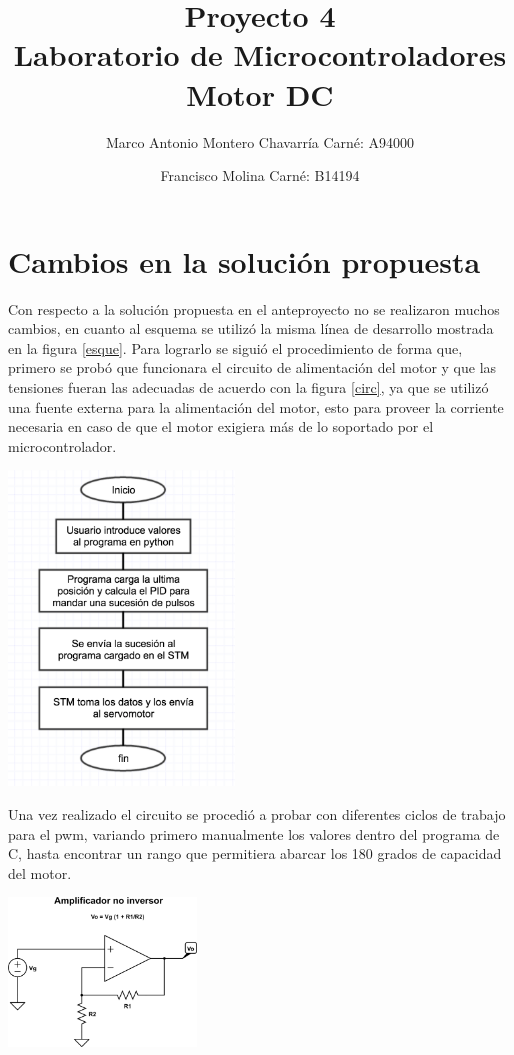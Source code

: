 \documentclass[letterpaper]{article}
\begin{document}
\title{Proyecto 4\\ Laboratorio de Microcontroladores Motor DC}
\author{
 Marco Antonio Montero Chavarría Carné: A94000\\
  \and
  Francisco Molina Carné: B14194\\  
}
\maketitle

\section{Cambios en la solución propuesta}
Con respecto a la solución propuesta en el anteproyecto no se realizaron muchos cambios, en cuanto al esquema se utilizó la misma línea de desarrollo mostrada en la figura \ref{esque}.  Para lograrlo se siguió el procedimiento de forma que, primero se probó que funcionara el circuito de alimentación del motor y que las tensiones fueran las adecuadas de acuerdo con la figura \ref{circ}, ya que se utilizó una fuente externa para la alimentación del motor, esto para proveer la corriente necesaria en caso de que el motor exigiera más de lo soportado por el microcontrolador. 
\begin{center}
\includegraphics[width=6cm]{micro.png}
\label{esque}
\end{center}
Una vez realizado el circuito se procedió a probar con diferentes ciclos de trabajo para el pwm, variando primero manualmente los valores dentro del programa de C, hasta encontrar un rango que permitiera abarcar los 180 grados de capacidad del motor. 

\begin{center}
\includegraphics[width=5cm]{amp.png}
\label{circ}
\end{center}
\end{document}
